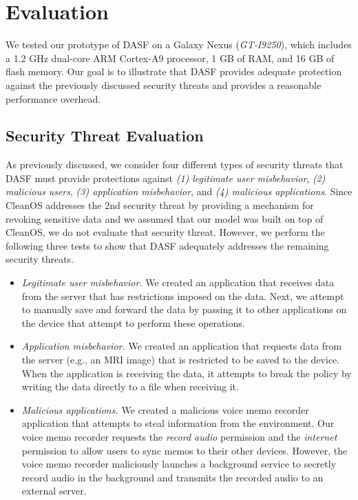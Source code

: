 \vspace{-3mm}
\section{Evaluation}

We tested our prototype of DASF on a Galaxy Nexus (\textit{GT-I9250}),
which includes a 1.2 GHz dual-core ARM Cortex-A9 processor,
1 GB of RAM, and 16 GB of flash memory.  Our goal is to
illustrate that DASF provides adequate protection against the
previously discussed security threats and provides a reasonable
performance overhead.

\subsection{Security Threat Evaluation}

As previously discussed, we consider four different types of security
threats that DASF must provide protections against
\textit{(1) legitimate user misbehavior},
\textit{(2) malicious users}, \textit{(3) application misbehavior},
and \textit{(4) malicious applications}.  Since CleanOS addresses
the 2nd security threat by providing a mechanism for revoking sensitive
data and we assumed that our model was built on top of CleanOS, we do not
evaluate that security threat.  However, we perform the following three
tests to show that DASF adequately addresses the remaining
security threats.

\begin{itemize}
\item \textit{Legitimate user misbehavior.}  We created an application that receives
  data from the server that has restrictions imposed on the data.  Next, we
  attempt to manually save and forward the data by passing it to other
  applications on the device that attempt to perform these operations.
\item \textit{Application misbehavior.}  We created an application that requests
  data from the server (e.g., an MRI image) that is restricted to be saved
  to the device.  When the application is receiving the data, it attempts
  to break the policy by writing the data directly to a file when receiving
  it.
\item \textit{Malicious applications.}  We created a malicious voice memo recorder
  application that attempts to steal information from the environment. Our
  voice memo recorder requests the \textit{record audio} permission
  and the \textit{internet} permission to allow users to sync memos to their
  other devices.  However, the voice memo recorder maliciously launches
  a background service to secretly record audio in the background and
  transmits the recorded audio to an external server.
\end{itemize}

